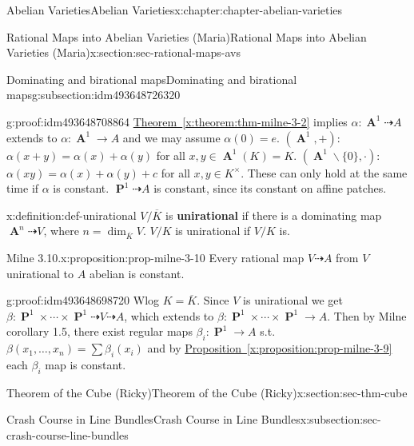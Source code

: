 \documentclass[oneside,10pt,]{book}
\newcommand{\terminology}[1]{\textbf{#1}}
\numberwithin{equation}{section}
\DeclareMathOperator{\aff}{\mathbf{A}}
\DeclareMathOperator{\PP}{\mathbf{P}}
\begin{document}
\begin{chapterptx}{Abelian Varieties}{}{Abelian Varieties}{}{}{x:chapter:chapter-abelian-varieties}
\begin{sectionptx}{Rational Maps into Abelian Varieties (Maria)}{}{Rational Maps into Abelian Varieties (Maria)}{}{}{x:section:sec-rational-maps-avs}
\begin{subsectionptx}{Dominating and birational maps}{}{Dominating and birational maps}{}{}{g:subsection:idm493648726320}
\begin{proofptx}{}{g:proof:idm493648708864}
\hyperref[x:theorem:thm-milne-3-2]{Theorem~\ref{x:theorem:thm-milne-3-2}} implies \(\alpha \colon \aff^1 \dashrightarrow A\) extends to \(\alpha \colon \aff^1\to A\) and we may assume \(\alpha(0) = e\). \((\aff^1, +)\): \(\alpha(x+y) = \alpha(x) + \alpha(y)\) for all \(x,y\in \aff^1(K) = K\). \((\aff^1\smallsetminus\{0\}, \cdot)\): \(\alpha(xy) = \alpha(x) + \alpha(y) + c\) for all \(x,y\in K^\times\). These can only hold at the same time if \(\alpha\) is constant. \(\PP^1 \dashrightarrow A\) is constant, since its constant on affine patches.%
\end{proofptx}
\begin{definition}{}{x:definition:def-unirational}%
\(V/\overline K\) is \terminology{unirational} if there is a dominating map \(\aff^n \dashrightarrow V\), where \(n = \dim_{\overline K} V\). \(V/K\) is unirational if \(V/K\) is.%
\end{definition}
\begin{proposition}{Milne 3.10.}{}{x:proposition:prop-milne-3-10}%
Every rational map \(V\dashrightarrow A\) from \(V\) unirational to \(A\) abelian is constant.%
\end{proposition}
\begin{proofptx}{}{g:proof:idm493648698720}
Wlog \(K = \overline K\). Since \(V\) is unirational we get \(\beta \colon \PP^1\times\cdots\times\PP^1 \dashrightarrow V\dashrightarrow A\), which extends to \(\beta \colon \PP^1\times\cdots\times\PP^1 \to A\). Then by Milne corollary 1.5, there exist regular maps \(\beta_i \colon \PP^1 \to A\) s.t. \(\beta(x_1,\ldots, x_n) = \sum \beta_i(x_i)\) and by \hyperref[x:proposition:prop-milne-3-9]{Proposition~\ref{x:proposition:prop-milne-3-9}} each \(\beta_i\) map is constant.%
\end{proofptx}
\end{subsectionptx}
\end{sectionptx}
%
%
\typeout{************************************************}
\typeout{************************************************}
%
\begin{sectionptx}{Theorem of the Cube (Ricky)}{}{Theorem of the Cube (Ricky)}{}{}{x:section:sec-thm-cube}
%
%
\typeout{************************************************}
\typeout{************************************************}
%
\begin{subsectionptx}{Crash Course in Line Bundles}{}{Crash Course in Line Bundles}{}{}{x:subsection:sec-crash-course-line-bundles}

\end{subsectionptx}
\end{sectionptx}
\end{chapterptx}
\end{document}
